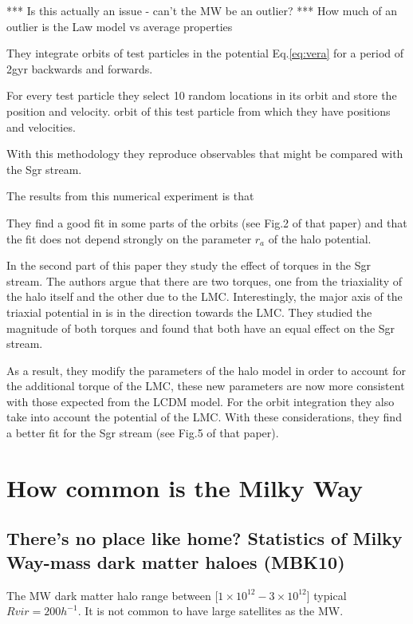 \documentclass[12pt]{article}
\begin{document}
*** Is this actually an issue - can’t the MW be an outlier?   
***  How much of an outlier is the Law model vs average properties


They integrate orbits of test particles in the potential Eq.\ref{eq:vera} for a period
of 2gyr backwards and forwards. 

For every test particle they select 10 random locations 
in its orbit and store the position and velocity. 
orbit of this test particle from which they have positions and velocities.

 With this methodology they reproduce observables that might be compared with 
the Sgr stream.

The results from this numerical experiment is that 

They find  a good fit in some
parts of the orbits (see Fig.2 of that paper) and that the fit does not depend
strongly on the parameter $r_a$ of the halo potential.

In the second part of this paper they study the effect of torques in the Sgr
stream. The authors argue that there are two torques, one from the triaxiality
of the halo itself and the other due to the LMC. Interestingly, the major
axis of the triaxial potential in \citep{Law10} is in the direction towards
 the LMC. They studied the magnitude of both torques and found that both
have an equal effect on the Sgr stream.

As a result, they modify the parameters of the halo model in order to account
for the additional torque of the LMC, these new parameters are now more consistent
 with those expected from the LCDM model. For the orbit integration they also take
into account the potential of the LMC. With these considerations, they find a better fit for  the Sgr
stream (see Fig.5 of that paper).

\section{How common is the Milky Way}

\subsection{There’s no place like home? Statistics of Milky Way-mass dark matter
haloes (MBK10)}

The MW dark matter halo range between [$1\times 10^{12} - 3\times 10^{12}$]
typical $Rvir = 200 h^{-1}$. It is not common to have large satellites as
the MW. 
\end{document}

